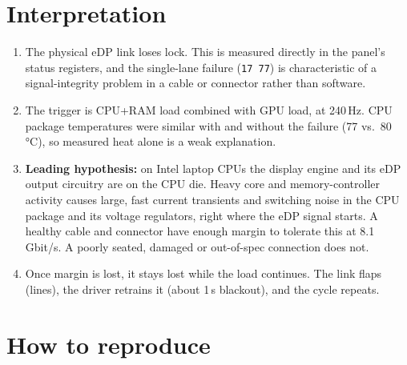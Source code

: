 \documentclass[11pt,a4paper]{article}
\newcommand{\reg}[1]{\texttt{#1}}
\begin{document}
\section{Interpretation}
\begin{enumerate}
\item The physical eDP link loses lock. This is measured directly in the panel's status registers, and the single-lane failure
(\reg{17 77}) is characteristic of a signal-integrity problem in a cable or connector rather than software.
\item The trigger is CPU+RAM load combined with GPU load, at 240\,Hz. CPU package temperatures were similar with and without the
failure (77 vs.\ 80\,\si{\celsius}), so measured heat alone is a weak explanation.
\item \textbf{Leading hypothesis:} on Intel laptop CPUs the display engine and its eDP output circuitry are on the CPU die. Heavy core
and memory-controller activity causes large, fast current transients and switching noise in the CPU package and its voltage regulators,
right where the eDP signal starts. A healthy cable and connector have enough margin to tolerate this at 8.1\,Gbit/s. A
poorly seated, damaged or out-of-spec connection does not.
\item Once margin is lost, it stays lost while the load continues. The link flaps (lines), the driver retrains it (about 1\,s blackout), and the cycle repeats.
\end{enumerate}

\section{How to reproduce}
\label{sec:repro}
\end{document}
